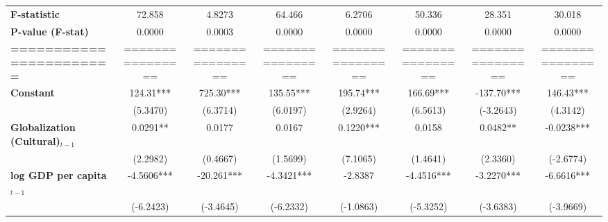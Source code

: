 \begin{center}
\begin{tabular}{lccccccc}
\textbf{F-statistic}               &        72.858        &            4.8273           &            64.466            &                6.2706               &              50.336              &            28.351           &             30.018             \\
\textbf{P-value (F-stat)}          &        0.0000        &            0.0003           &            0.0000            &                0.0000               &              0.0000              &            0.0000           &             0.0000             \\
\textbf{=======================}   &   ================   &       ================      &       ================       &           ================          &         ================         &       ================      &        ================        \\
\textbf{Constant}                     &      124.31***       &          725.30***          &          135.55***           &              195.74***              &            166.69***             &          -137.70***         &           146.43***            \\
\textbf{ }                         &       (5.3470)       &           (6.3714)          &           (6.0197)           &               (2.9264)              &             (6.5613)             &          (-3.2643)          &            (4.3142)            \\
\textbf{Globalization (Cultural)$_{t-1}$}             &       0.0291**       &            0.0177           &            0.0167            &              0.1220***              &              0.0158              &           0.0482**          &           -0.0238***           \\
\textbf{ }                         &       (2.2982)       &           (0.4667)          &           (1.5699)           &               (7.1065)              &             (1.4641)             &           (2.3360)          &           (-2.6774)            \\
\textbf{log GDP per capita$_{t-1}$}           &      -4.5606***      &          -20.261***         &          -4.3421***          &               -2.8387               &            -4.4516***            &          -3.2270***         &           -6.6616***           \\
\textbf{ }                         &      (-6.2423)       &          (-3.4645)          &          (-6.2332)           &              (-1.0863)              &            (-5.3252)             &          (-3.6383)          &           (-3.9669)            \\

\end{tabular}
\end{center}
